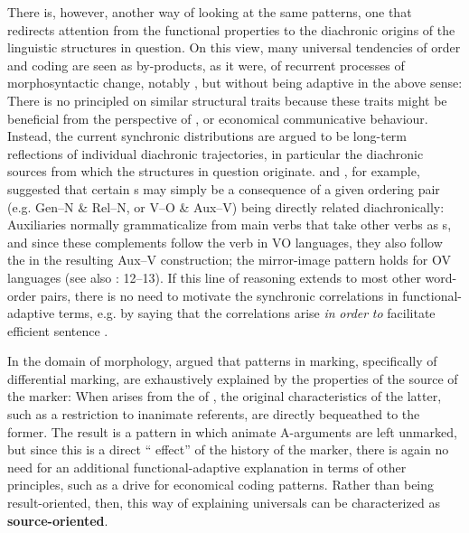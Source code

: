 \documentclass[output=paper]{langsci/langscibook}
\begin{document}
There is, however, another way of looking at the same patterns, one that redirects attention from the functional properties to the diachronic origins of the linguistic structures in question. On this view, many universal tendencies of order and coding are seen as by-products, as it were, of recurrent processes of morphosyntactic change, notably , but without being adaptive in the above sense: There is no principled  on similar structural traits because these traits might be beneficial from the perspective of ,  or economical communicative behaviour. Instead, the current synchronic distributions are argued to be long-term reflections of individual diachronic trajectories, in particular the diachronic sources from which the structures in question originate. \citet{Givón1984} and \citet{Aristar1991}, for example, suggested that certain s may simply be a consequence of a given ordering pair (e.g. Gen–N \& Rel–N, or V–O \& Aux–V) being directly related diachronically: Auxiliaries normally grammaticalize from main verbs that take other verbs as s, and since these complements follow the verb in VO languages, they also follow the  in the resulting Aux–V construction; the mirror-image pattern holds for OV languages (see also \citealt{Lehmann1986}: 12–13). If this line of reasoning extends to most other word-order pairs, there is no need to motivate the synchronic correlations in functional-adaptive terms, e.g. by saying that the correlations arise \textit{in} \textit{order} \textit{to} facilitate efficient sentence . 

In the domain of morphology, \citet{Garrett1990} argued that patterns in  marking, specifically of differential  marking, are exhaustively explained by the properties of the source of the  marker: When   arises from the  of  , the original characteristics of the latter, such as a restriction to inanimate referents, are directly bequeathed to the former. The result is a pattern in which animate A-arguments are left unmarked, but since this is a direct “ effect” \citep{Hopper1991} of the history of the  marker, there is again no need for an additional functional-adaptive explanation in terms of other principles, such as a drive for economical coding patterns. Rather than being result-oriented, then, this way of explaining universals can be characterized as \textbf{source-oriented}.
\end{document}
